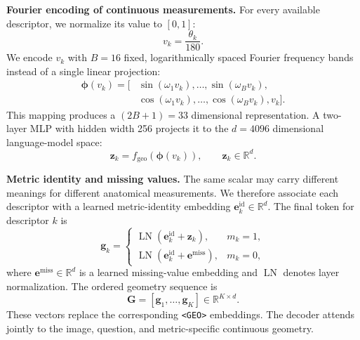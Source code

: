 \noindent\textbf{Fourier encoding of continuous measurements.}
For every available descriptor, we normalize its value to $[0,1]$:
\begin{equation}
    v_k=\frac{\theta_k}{180}.
    \label{eq:angle_normalization}
\end{equation}
We encode $v_k$ with $B=16$ fixed, logarithmically spaced Fourier frequency bands instead of a single linear projection:
\begin{equation}
\begin{split}
    \boldsymbol{\phi}(v_k)=\big[
        &\sin(\omega_1v_k),\ldots,\sin(\omega_Bv_k),\\
        &\cos(\omega_1v_k),\ldots,\cos(\omega_Bv_k),v_k
    \big].
\end{split}
\label{eq:fourier_features}
\end{equation}
This mapping produces a $(2B+1)=33$ dimensional representation.
A two-layer MLP with hidden width 256 projects it to the $d=4096$ dimensional language-model space:
\begin{equation}
    \mathbf{z}_k
    =f_{\mathrm{geo}}\!\left(\boldsymbol{\phi}(v_k)\right),
    \qquad \mathbf{z}_k\in\mathbb{R}^{d}.
    \label{eq:scalar_projection}
\end{equation}

\noindent\textbf{Metric identity and missing values.}
The same scalar may carry different meanings for different anatomical measurements.
We therefore associate each descriptor with a learned metric-identity embedding $\mathbf{e}^{\mathrm{id}}_k\in\mathbb{R}^{d}$.
The final token for descriptor $k$ is
\begin{equation}
    \mathbf{g}_k=
    \begin{cases}
    \operatorname{LN}\!\left(
        \mathbf{e}^{\mathrm{id}}_k+\mathbf{z}_k
    \right), & m_k=1,\\[5pt]
    \operatorname{LN}\!\left(
        \mathbf{e}^{\mathrm{id}}_k+\mathbf{e}^{\mathrm{miss}}
    \right), & m_k=0,
    \end{cases}
    \label{eq:geometry_token}
\end{equation}
where $\mathbf{e}^{\mathrm{miss}}\in\mathbb{R}^{d}$ is a learned missing-value embedding and $\operatorname{LN}$ denotes layer normalization.
The ordered geometry sequence is
\begin{equation}
    \mathbf{G}=[\mathbf{g}_1,\ldots,\mathbf{g}_K]
    \in\mathbb{R}^{K\times d}.
    \label{eq:geometry_sequence}
\end{equation}
These vectors replace the corresponding \texttt{<GEO>} embeddings.
The decoder attends jointly to the image, question, and metric-specific continuous geometry.

